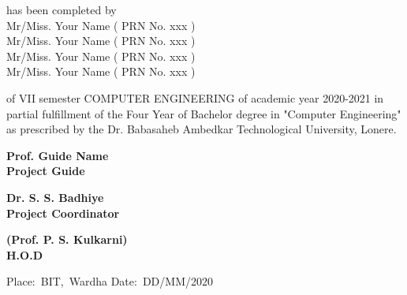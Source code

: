 \documentclass[a4paper, 12pt]{report}
\begin{document}
\begin{frontmatter}
\begin{titlepage}
\begin{center}
has been completed by \\
Mr/Miss. Your Name ( PRN No. xxx ) \\
Mr/Miss. Your Name ( PRN No. xxx ) \\
Mr/Miss. Your Name ( PRN No. xxx ) \\
Mr/Miss. Your Name ( PRN No. xxx ) \\
\end{center} 
of VII semester COMPUTER ENGINEERING of academic year 2020-2021 in partial fulfillment of the Four Year of Bachelor degree in "Computer Engineering" as prescribed by the Dr. Babasaheb Ambedkar Technological University, Lonere.
\vspace{2cm}
\begin{multicols}{3}
\begin{center}
\textbf{Prof. Guide Name\\Project Guide}\hspace{5cm}\\
\end{center}
\begin{center}
\textbf{Dr. S. S. Badhiye\\Project Coordinator}\hspace{5cm}\\
\end{center}
\begin{center}
\textbf{(Prof. P. S. Kulkarni)\\H.O.D}\\
\end{center}
\vspace{0.5cm}
\end{multicols}
\hbox {Place: BIT, Wardha\\}
\hbox {Date: DD/MM/2020\\}
\vfill
\end{titlepage}

\pagebreak


\end{frontmatter}
\end{document}
